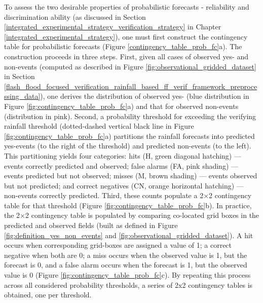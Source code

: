 To  assess the two desirable properties of probabilistic forecasts - reliability and discrimination ability (as discussed in Section \ref{integrated_experimental_strategy_verification_strategy} in Chapter \ref{integrated_experimental_strategy}), one must first construct the contingency table for probabilistic forecasts (Figure \ref{contingency_table_prob_fc}a). The construction proceeds in three steps. First, given all cases of observed yes- and non-events (computed as described in Figure \ref{fig:observational_gridded_dataset} in Section \ref{flash_flood_focused_verification_rainfall_based_ff_verif_framework_preprocessing_data}), one derives the distribution of observed yes- (blue distribution in Figure \ref{fig:contingency_table_prob_fc}a) and that for observed non-events (distribution in pink). Second, a probability threshold for exceeding the verifying rainfall threshold (dotted-dashed vertical black line in Figure \ref{fig:contingency_table_prob_fc}a) partitions the rainfall forecasts into predicted yes-events (to the right of the threshold) and predicted non-events (to the left). This partitioning yields four categories: hits (H, green diagonal hatching) — events correctly predicted and observed; false alarms (FA, pink shading) — events predicted but not observed; misses (M, brown shading) — events observed but not predicted; and correct negatives (CN, orange horizontal hatching) — non-events correctly predicted. Third, these counts populate a 2×2 contingency table for that threshold (Figure \ref{fig:contingency_table_prob_fc}b). In practice, the 2×2 contingency table is populated by comparing co-located grid boxes in the predicted and observed fields (built as defined in Figure \ref{fig:definition_yes_non_events} and \ref{fig:observational_gridded_dataset}). A hit occurs when corresponding grid-boxes are assigned a value of 1; a correct negative when both are 0; a miss occurs when the observed value is 1, but the forecast is 0, and a false alarm occurs when the forecast is 1, but the observed value is 0 (Figure \ref{fig:contingency_table_prob_fc}c). By repeating this process across all considered probability thresholds, a series of 2x2 contingency tables is obtained, one per threshold.

